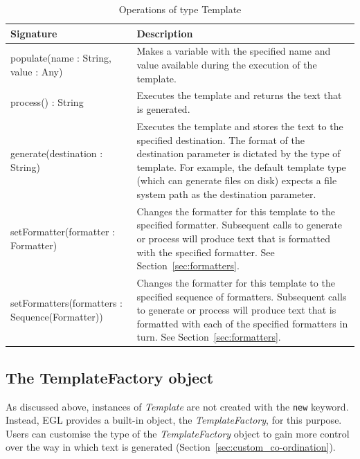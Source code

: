 \begin{longtable} {|p{5.5cm}|p{6.5cm}|}
			
			\caption{Operations of type Template}
			\label{tab:TemplateOperations}\\
			
			\hline
							
			\textbf{Signature} & \textbf{Description} \\\hline
			
			populate(name : String, value : Any) & Makes a variable with the specified name and value available during the execution of the template. \\\hline
			
			process() : String & Executes the template and returns the text that is generated.  \\\hline
			
			generate(destination : String) & Executes the template and stores the text to the specified destination. The format of the destination parameter is dictated by the type of template. For example, the default template type (which can generate files on disk) expects a file system path as the destination parameter. \\\hline
			
			setFormatter(formatter : Formatter) & Changes the formatter for this template to the specified formatter. Subsequent calls to generate or process will produce text that is formatted with the specified formatter. See Section~\ref{sec:formatters}. \\\hline
			
			setFormatters(formatters : Sequence(Formatter)) & Changes the formatter for this template to the specified sequence of formatters. Subsequent calls to generate or process will produce text that is formatted with each of the specified formatters in turn. See Section~\ref{sec:formatters}. \\\hline
\end{longtable}


\subsection{The TemplateFactory object}
As discussed above, instances of \emph{Template} are not created with the \texttt{new} keyword. Instead, EGL provides a built-in object, the \emph{TemplateFactory}, for this purpose. Users can customise the type of the \emph{TemplateFactory} object to gain more control over the way in which text is generated (Section~\ref{sec:custom_co-ordination}).

